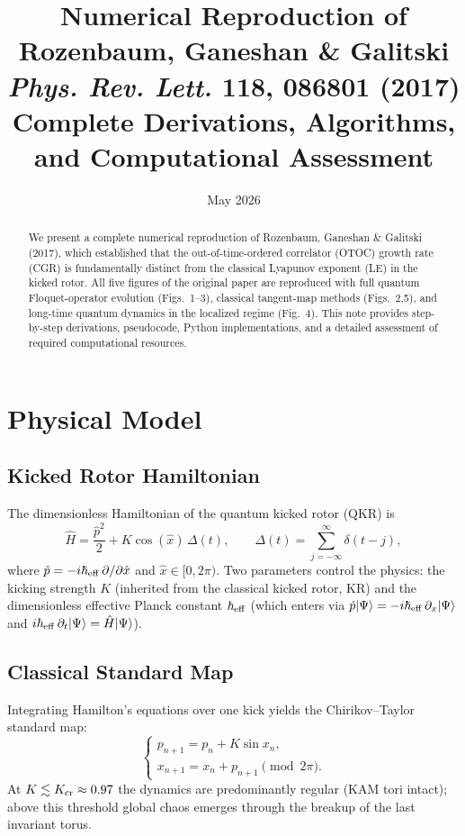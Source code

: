\documentclass[11pt,a4paper]{article}
\title{\bfseries Numerical Reproduction of \\ Rozenbaum, Ganeshan \& Galitski \\[4pt]
\normalsize\textit{Phys. Rev. Lett.} \textbf{118}, 086801 (2017)\\[4pt]
\normalsize Complete Derivations, Algorithms, and Computational Assessment}
\author{}
\date{May 2026}
\newcommand{\hb}{\hbar_{\rm eff}}
\begin{document}
\maketitle

\begin{abstract}
We present a complete numerical reproduction of Rozenbaum, Ganeshan \& Galitski (2017), which established that the out-of-time-ordered correlator (OTOC) growth rate (CGR) is fundamentally distinct from the classical Lyapunov exponent (LE) in the kicked rotor. All five figures of the original paper are reproduced with full quantum Floquet-operator evolution (Figs.~1--3), classical tangent-map methods (Figs.~2,5), and long-time quantum dynamics in the localized regime (Fig.~4). This note provides step-by-step derivations, pseudocode, Python implementations, and a detailed assessment of required computational resources.
\end{abstract}

\section{Physical Model}

\subsection{Kicked Rotor Hamiltonian}

The dimensionless Hamiltonian of the quantum kicked rotor (QKR) is
\begin{equation}\label{eq:H}
\hat{H} = \frac{\hat{p}^{2}}{2} + K\cos(\hat{x})\,\Delta(t),\qquad
\Delta(t)=\sum_{j=-\infty}^{\infty}\delta(t-j),
\end{equation}
where $\hat{p}=-i\hb\,\partial/\partial\hat{x}$ and $\hat{x}\in[0,2\pi)$. Two parameters control the physics: the kicking strength $K$ (inherited from the classical kicked rotor, KR) and the dimensionless effective Planck constant $\hb$ (which enters via $\hat{p}|\Psi\rangle = -i\hb\,\partial_{x}|\Psi\rangle$ and $i\hb\,\partial_{t}|\Psi\rangle=\hat{H}|\Psi\rangle$).

\subsection{Classical Standard Map}

Integrating Hamilton's equations over one kick yields the Chirikov--Taylor standard map:
\begin{equation}\label{eq:stdmap}
\begin{cases}
p_{n+1} = p_n + K\sin x_n,\\[2pt]
x_{n+1} = x_n + p_{n+1} \pmod{2\pi}.
\end{cases}
\end{equation}
At $K\lesssim K_{\rm cr}\approx 0.97$ the dynamics are predominantly regular (KAM tori intact); above this threshold global chaos emerges through the breakup of the last invariant torus.
\end{document}
